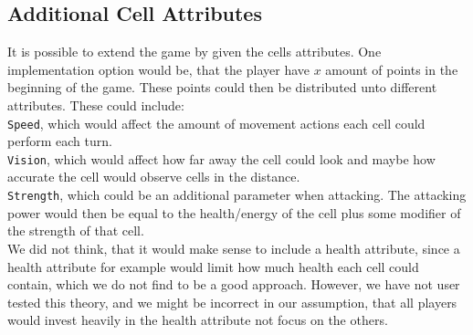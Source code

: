 \subsection{Additional Cell Attributes}
It is possible to extend the game by given the cells attributes. One implementation option would be, that the player have $x$ amount of points in the beginning of the game. These points could then be distributed unto different attributes. These could include:\\

\verb|Speed|, which would affect the amount of movement actions each cell could perform each turn.\\
\verb|Vision|, which would affect how far away the cell could look and maybe how accurate the cell would observe cells in the distance.\\
\verb|Strength|, which could be an additional parameter when attacking. The attacking power would then be equal to the health/energy of the cell plus some modifier of the strength of that cell.\\

We did not think, that it would make sense to include a health attribute, since a health attribute for example would limit how much health each cell could contain, which we do not find to be a good approach. However, we have not user tested this theory, and we might be incorrect in our assumption, that all players would invest heavily in the health attribute not focus on the others.